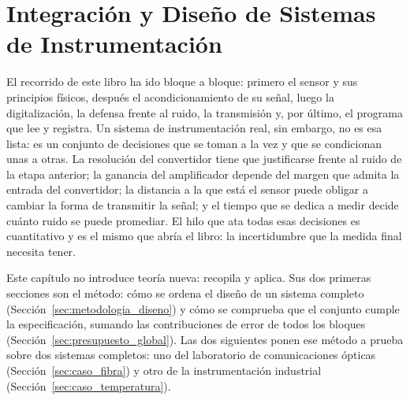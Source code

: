 

\chapter{Integración y Diseño de Sistemas de Instrumentación}\label{cap:integracion}

El recorrido de este libro ha ido bloque a bloque: primero el sensor y sus principios físicos, después el acondicionamiento de su señal, luego la digitalización, la defensa frente al ruido, la transmisión y, por último, el programa que lee y registra. Un sistema de instrumentación real, sin embargo, no es esa lista: es un conjunto de decisiones que se toman a la vez y que se condicionan unas a otras. La resolución del convertidor tiene que justificarse frente al ruido de la etapa anterior; la ganancia del amplificador depende del margen que admita la entrada del convertidor; la distancia a la que está el sensor puede obligar a cambiar la forma de transmitir la señal; y el tiempo que se dedica a medir decide cuánto ruido se puede promediar. El hilo que ata todas esas decisiones es cuantitativo y es el mismo que abría el libro: la incertidumbre que la medida final necesita tener.

Este capítulo no introduce teoría nueva: recopila y aplica. Sus dos primeras secciones son el método: cómo se ordena el diseño de un sistema completo (Sección~\ref{sec:metodologia_diseno}) y cómo se comprueba que el conjunto cumple la especificación, sumando las contribuciones de error de todos los bloques (Sección~\ref{sec:presupuesto_global}). Las dos siguientes ponen ese método a prueba sobre dos sistemas completos: uno del laboratorio de comunicaciones ópticas (Sección~\ref{sec:caso_fibra}) y otro de la instrumentación industrial (Sección~\ref{sec:caso_temperatura}).

